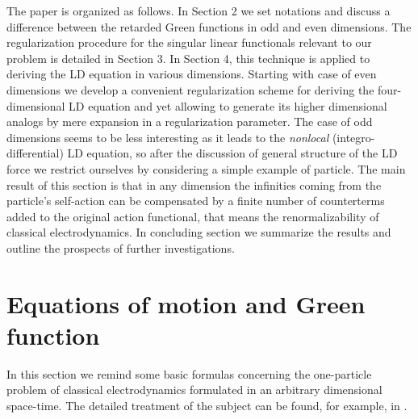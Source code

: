 \documentclass[a4paper,12pt]{article}
\begin{document}
The paper is organized as follows. In Section 2 we set notations and discuss
a difference between the retarded Green functions in odd and even
dimensions. The regularization procedure for the singular linear functionals
relevant to our problem is detailed in Section 3. In Section 4, this
technique is applied to deriving the LD equation in various dimensions.
Starting with case of even dimensions we develop a convenient regularization
scheme for deriving the four-dimensional LD equation and yet allowing to
generate its higher dimensional analogs by mere expansion in a
regularization parameter. The case of odd dimensions seems to be less
interesting as it leads to the {\it nonlocal} (integro-differential) LD
equation, so after the discussion of general structure of the LD force we
restrict ourselves by considering a simple example of \coordHE{} particle. The
main result of this section is that in any dimension the infinities coming
from the particle's self-action can be compensated by a finite number of
counterterms added to the original action functional, that means the
renormalizability of classical electrodynamics. In concluding section we
summarize the results and outline the prospects of further investigations.

\section{ Equations of motion and Green function}

In this section we remind some basic formulas concerning the one-particle
problem of classical electrodynamics formulated in an arbitrary dimensional
space-time. The detailed treatment of the subject can be found, for example,
in \cite{IS}.
\end{document}
